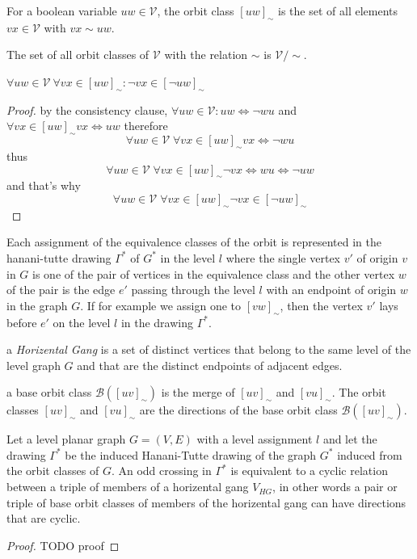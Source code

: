 \begin{definition}
    For a boolean variable $uw \in \mathcal{V}$, the orbit class $[uw]_\mathcal{\sim}$ is 
    the set of all elements $vx \in \mathcal{V}$ with $vx \sim uw$. 

    The set of all orbit classes of $\mathcal{V}$ with the relation $\sim$ is $\mathcal{V}/\sim$.

\end{definition}

\begin{lemma}
    $\forall uw \in \mathcal{V} \  \forall vx \in [uw]_{\sim} : \neg vx \in [\neg uw]_{\sim}$  
\end{lemma}
\begin{proof}
    by the consistency clause, $\forall uw \in \mathcal{V} : uw \iff \neg wu$ and  $\forall vx \in [uw]_{\sim} vx \iff uw$ 
    therefore \[\forall uw \in \mathcal{V} \; \forall vx \in [uw]_{\sim} vx \iff \neg wu\]
    thus \[\forall uw \in \mathcal{V} \; \forall vx \in [uw]_{\sim} \neg vx \iff wu \iff \neg uw \] 
    and that's why \[\forall uw \in \mathcal{V} \; \forall vx \in [uw]_{\sim} \neg vx \in [\neg uw]_{\sim} \] 
\end{proof}

Each assignment of the equivalence classes of the orbit is represented in the hanani-tutte drawing $\Gamma^*$ of $G^*$ in the 
level $l$ where the single vertex $v'$ of origin $v$ in $G$ is one of the pair of vertices in the equivalence class and the other vertex $w$
of the pair is the edge $e'$ passing through the level $l$ with an endpoint of origin $w$ in the graph $G$. 
If for example we assign one to $[vw]_{\sim}$, then the vertex $v'$ lays before $e'$ on the level $l$ in the drawing $\Gamma^*$. 

\begin{definition}
    a \textit{Horizental Gang} is a set of distinct vertices that belong to the same level of the level graph $G$ and that are the distinct 
   endpoints of adjacent edges.
\end{definition}

\begin{definition}
    a base orbit class $\mathcal{B}\left( [uv]_\sim \right)$ is the merge of $[uv]_\sim$ and $[vu]_\sim$. 
    The orbit classes $[uv]_\sim$ and $[vu]_\sim$ are the directions of the base orbit class $\mathcal{B}\left( [uv]_\sim \right)$.
    
\end{definition}
\begin{lemma}
    \label{lm:cyclerel}
   Let a level planar graph $G=\left( V,E \right)$ with a level assignment $l$ and let the drawing $\Gamma^*$ be the induced 
   Hanani-Tutte drawing of the graph $G^*$ induced from the orbit classes of $G$. An odd crossing in $\Gamma^*$ is 
   equivalent to a cyclic relation between a triple of members of a horizental gang $V_{HG}$, in other words
   a pair or triple of base orbit classes of members of the horizental gang can have directions that are cyclic. 
\end{lemma}
\begin{proof}
   TODO proof 
\end{proof}

